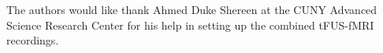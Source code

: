 The authors would like thank Ahmed Duke Shereen at the CUNY Advanced Science Research Center for his help in setting up the combined tFUS-fMRI recordings. 
